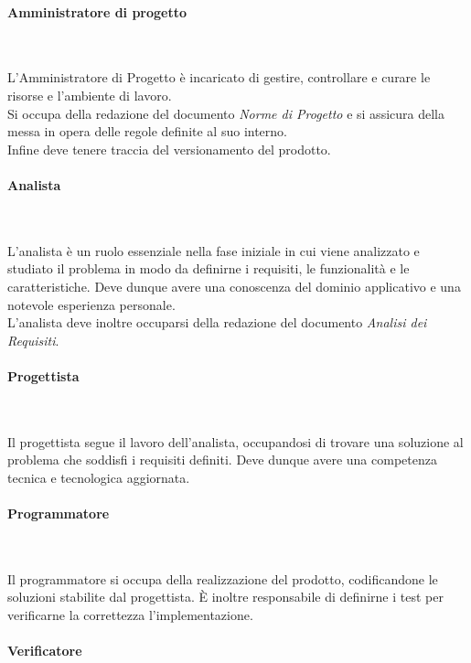         \paragraph{Amministratore di progetto} ~

        L’Amministratore di Progetto è incaricato di gestire, controllare e curare le risorse e l'ambiente di lavoro.\\
        Si occupa della redazione del documento \textit{Norme di Progetto} e si assicura della messa in opera delle regole definite al suo interno.\\
        Infine deve tenere traccia del versionamento del prodotto.

        \paragraph{Analista} ~

        L'analista è un ruolo essenziale nella fase iniziale in cui viene analizzato e studiato il problema in modo da definirne i requisiti, le funzionalità e le caratteristiche. Deve dunque avere una conoscenza del dominio applicativo e una notevole esperienza personale.\\
        L'analista deve inoltre occuparsi della redazione del documento \textit{Analisi dei Requisiti}.

        \paragraph{Progettista} ~

        Il progettista segue il lavoro dell'analista, occupandosi di trovare una soluzione al problema che soddisfi i requisiti definiti. Deve dunque avere una competenza tecnica e tecnologica aggiornata.

        \paragraph{Programmatore} ~

        Il programmatore si occupa della realizzazione del prodotto, codificandone le soluzioni stabilite dal progettista.
        È inoltre responsabile di definirne i test per verificarne la correttezza l'implementazione.

        \paragraph{Verificatore} ~

